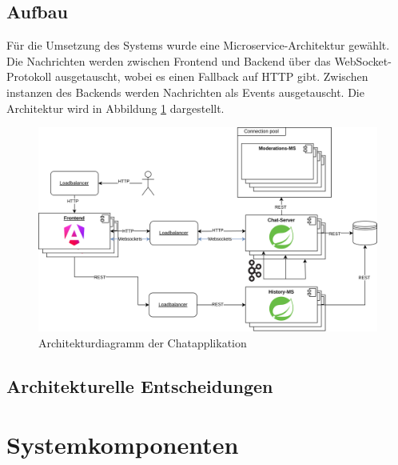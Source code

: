 \documentclass[12pt]{report}
\begin{document}
\subsection{Aufbau}
Für die Umsetzung des Systems wurde eine Microservice-Architektur gewählt. Die Nachrichten werden zwischen Frontend und Backend über das WebSocket-Protokoll ausgetauscht, wobei es einen Fallback auf HTTP gibt. Zwischen instanzen des Backends werden Nachrichten als Events ausgetauscht. Die Architektur wird in Abbildung \ref{fig:Architektur} dargestellt.
\begin{figure}[htbp]
	\centering
	\includegraphics[width=\linewidth]{architektur}
	\caption{Architekturdiagramm der Chatapplikation}
	\label{fig:Architektur}
\end{figure}
\subsection{Architekturelle Entscheidungen}

\section{Systemkomponenten}
\end{document}
